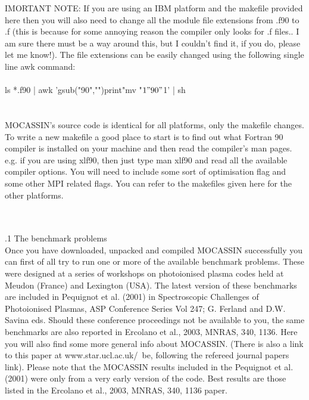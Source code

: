 \documentclass[11pt]{article}
\begin{document}
\noindent   IMORTANT NOTE: If you are using an IBM platform and the makefile provided here
   then you will also need to change all the module file extensions from 
   .f90 to .f (this is because for some annoying reason the compiler only 
   looks for .f files.. I am sure there must be a way around this, but I 
   couldn't find it, if you do, please let me know!). The file extensions can
   be easily changed using the following single line awk command: \\
\\
\indent     ls *.f90 | awk 'gsub("90",""){print"mv "$1"90 "$1}' | sh\\
\\
\\
   MOCASSIN's source code is identical for all platforms, only the
   makefile  changes. To write a new makefile a good place to start is
   to find out what Fortran 90 compiler is installed on your machine
   and then read the compiler's man pages.  e.g. if you are using
   xlf90, then just type  man xlf90  and read all the available
   compiler options. You will need to include some  sort of
   optimisation flag and some other MPI related flags. You can refer
   to the makefiles given here for the other platforms.\\

\pagebreak

\\

\\

.1  The benchmark problems\\
        Once you have downloaded, unpacked and compiled MOCASSIN successfully you can 
        first of all try to run one or more of the available benchmark problems. These 
        were designed at a series of workshops on photoionised plasma codes held 
        at Meudon (France) and Lexington (USA). The latest version of these benchmarks
        are included in Pequignot et al. (2001) in Spectroscopic Challenges of 
        Photoionised Plasmas, ASP Conference Series Vol 247; G. Ferland and D.W. Savina
        eds. Should these conference proceedings not be available to you, the same 
        benchmarks are also reported in Ercolano et al., 2003, MNRAS, 340, 1136. 
        Here you will also find some more general info about MOCASSIN. 
        (There is also a link to this paper at www.star.ucl.ac.uk/~be, following the 
        refereed journal papers link).
	Please note that the MOCASSIN results included in the Pequignot et al. (2001)
	were only from a very early version of the code. Best results are those 
	listed in the Ercolano et al., 2003, MNRAS, 340, 1136 paper.\\
\end{document}
